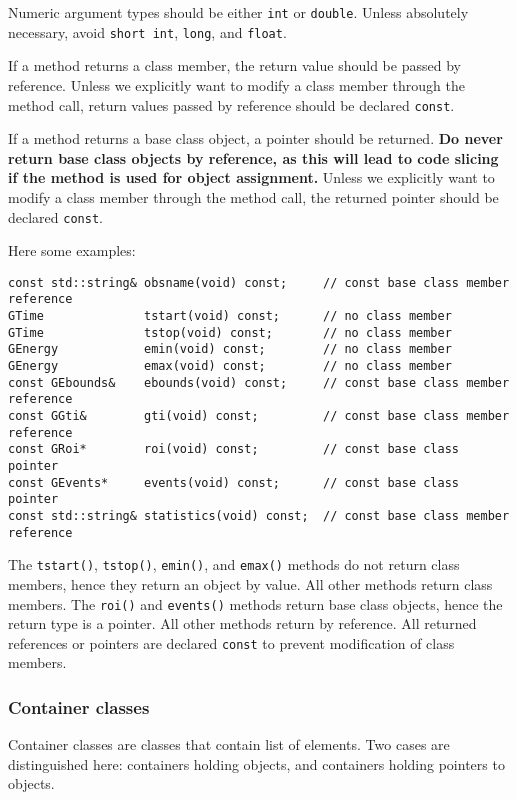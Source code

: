 \documentclass{article}[12pt,a4]
\begin{document}
Numeric argument types should be either {\tt int} or {\tt double}.
Unless absolutely necessary, avoid {\tt short int}, {\tt long}, and {\tt float}.

If a method returns a class member, the return value should be passed by reference.
Unless we explicitly want to modify a class member through the method call,
return values passed by reference should be declared {\tt const}.

If a method returns a base class object, a pointer should be returned.
{\bf Do never return base class objects by reference, as this will lead to
code slicing if the method is used for object assignment.}
Unless we explicitly want to modify a class member through the method call,
the returned pointer should be declared {\tt const}.

Here some examples:
\begin{verbatim}
const std::string& obsname(void) const;     // const base class member reference
GTime              tstart(void) const;      // no class member
GTime              tstop(void) const;       // no class member
GEnergy            emin(void) const;        // no class member
GEnergy            emax(void) const;        // no class member
const GEbounds&    ebounds(void) const;     // const base class member reference
const GGti&        gti(void) const;         // const base class member reference
const GRoi*        roi(void) const;         // const base class pointer
const GEvents*     events(void) const;      // const base class pointer
const std::string& statistics(void) const;  // const base class member reference
\end{verbatim}
The {\tt tstart()}, {\tt tstop()}, {\tt emin()}, and {\tt emax()} methods do not return class members,
hence they return an object by value.
All other methods return class members.
The {\tt roi()} and {\tt events()} methods return base class objects, hence the return type
is a pointer.
All other methods return by reference.
All returned references or pointers are declared {\tt const} to prevent modification of
class members.


\subsubsection{Container classes}
\label{sec:containers}

Container classes are classes that contain list of elements.
Two cases are distinguished here: containers holding objects, and containers holding
pointers to objects.
\end{document}
